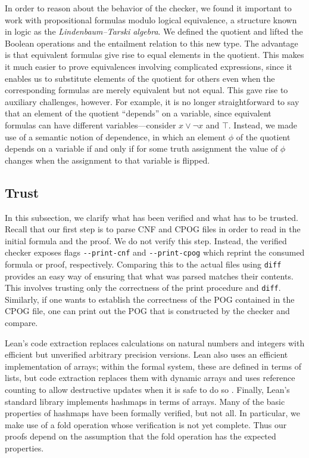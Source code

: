In order to reason about the behavior of the checker, we found it important to work
with propositional formulas modulo logical equivalence, a structure known in logic
as the \emph{Lindenbaum--Tarski algebra}.
We defined the quotient and lifted the Boolean operations and the entailment
relation to this new type. The advantage is that equivalent formulas give
rise to equal elements in the quotient.
This makes it much easier to prove equivalences involving complicated expressions,
since it enables us to substitute elements of the quotient for others even when the corresponding
formulas are merely equivalent but not equal. This gave rise to auxiliary challenges, however.
For example, it is no longer straightforward to say that an element of the quotient ``depends'' on a variable,
since equivalent formulas can have different variables---consider $x \vee \neg x$ and $\top$.
Instead, we made use of a semantic notion of dependence, in which an element $\phi$ of the
quotient depends on a variable if and only if for some truth assignment the value of $\phi$
changes when the assignment to that variable is flipped.

\subsection{Trust}

In this subsection, we clarify what has been verified and what has to be trusted.
Recall that our first step is to parse CNF and CPOG files in order to read in the initial
formula and the proof. We do not verify this step. Instead, the verified checker exposes
flags \verb+--print-cnf+ and \verb+--print-cpog+ which reprint the consumed formula or proof,
respectively. Comparing this to the actual files using {\tt diff} provides an easy way of ensuring
that what was parsed matches their contents. This involves trusting only the correctness of the
print procedure and {\tt diff}. Similarly, if one wants to establish the correctness of the POG
contained in the CPOG file, one can print out the POG that is constructed by the checker and compare.

Lean's code extraction replaces calculations on natural numbers and integers with
efficient but unverified arbitrary precision versions.
Lean also uses an efficient implementation of arrays; within the
formal system, these are defined in terms of lists, but code extraction replaces them
with dynamic arrays and uses reference counting to allow destructive updates when it is safe
to do so \cite{Ullrich:de:Moura:19}.
Finally, Lean's standard library implements hashmaps in terms of arrays.
Many of the basic properties of hashmaps have been formally verified, but not all.
In particular, we make use of a fold operation whose verification is not yet complete.
Thus our proofs depend on the assumption that the fold operation has the
expected properties.

